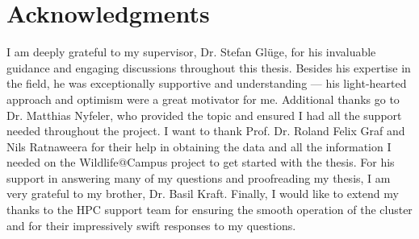 

\vspace*{\fill}

\section*{Acknowledgments}
\label{acknowledgments}

I am deeply grateful to my supervisor, Dr. Stefan Glüge, for his invaluable guidance and engaging discussions throughout this thesis.
Besides his expertise in the field, he was exceptionally supportive and understanding --- his light-hearted approach and optimism were a great motivator for me.
Additional thanks go to Dr. Matthias Nyfeler, who provided the topic and ensured I had all the support needed throughout the project.  
I want to thank Prof. Dr. Roland Felix Graf and Nils Ratnaweera for their help in obtaining the data and all the information I needed on the Wildlife@Campus project to get started with the thesis.
For his support in answering many of my questions and proofreading my thesis, I am very grateful to my brother, Dr. Basil Kraft.
Finally, I would like to extend my thanks to the HPC support team for ensuring the smooth operation of the cluster and for their impressively swift responses to my questions.
\vspace*{\fill}

